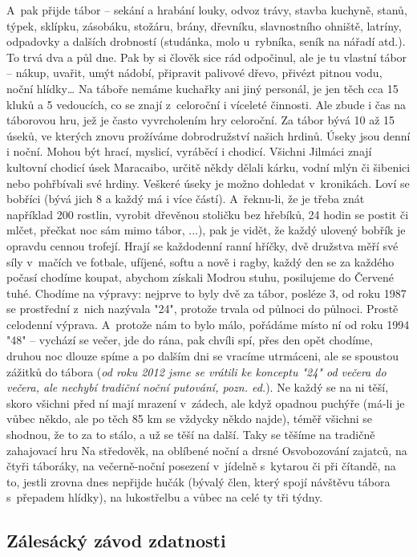 \documentclass[a5paper, 11pt, twoside]{article}
\begin{document}
A~pak přijde tábor -- sekání a hrabání louky, odvoz trávy, stavba
kuchyně, stanů, týpek, sklípku, zásobáku, stožáru, brány, dřevníku,
slavnostního ohniště, latríny, odpadovky a dalších drobností (studánka,
molo u~rybníka, seník na nářadí atd.). To trvá dva a půl dne. Pak by si
člověk sice rád odpočinul, ale je tu vlastní tábor -- nákup, uvařit,
umýt nádobí, připravit palivové dřevo, přivézt pitnou vodu, noční
hlídky\ldots{} Na táboře nemáme kuchařky ani jiný personál, je jen těch
cca 15 kluků a 5 vedoucích, co se znají z~celoroční i víceleté činnosti.
Ale zbude i čas na táborovou hru, jež je často vyvrcholením hry
celoroční. Za tábor bývá 10 až 15 úseků, ve kterých znovu prožíváme
dobrodružství našich hrdinů. Úseky jsou denní i noční. Mohou být hrací,
myslicí, vyráběcí i chodicí. Všichni Jilmáci znají kultovní chodicí úsek
Maracaibo, určitě někdy dělali kárku, vodní mlýn či šibenici nebo
pohřbívali své hrdiny. Veškeré úseky je možno dohledat v~kronikách. Loví
se bobříci (bývá jich 8 a každý má i více částí). A~řeknu-li, že je
třeba znát například 200 rostlin, vyrobit dřevěnou stoličku bez hřebíků,
24 hodin se postit či mlčet, přečkat noc sám mimo tábor, ...), pak je
vidět, že každý ulovený bobřík je opravdu cennou trofejí. Hrají se
každodenní ranní hříčky, dvě družstva měří své síly v~mačích ve fotbale,
ufíjené, softu a nově i ragby, každý den se za každého počasí chodíme
koupat, abychom získali Modrou stuhu, posilujeme do Červené tuhé.
Chodíme na výpravy: nejprve to byly dvě za tábor, posléze 3, od roku
1987 se prostřední z~nich nazývala "24", protože trvala od půlnoci do
půlnoci. Prostě celodenní výprava. A~protože nám to bylo málo, pořádáme
místo ní od roku 1994 "48" -- vychází se večer, jde do rána, pak chvíli
spí, přes den opět chodíme, druhou noc dlouze spíme a po dalším dni se
vracíme utrmáceni, ale se spoustou zážitků do tábora (\textit{od roku 2012
jsme se vrátili ke konceptu "24" od večera do večera, ale nechybí
tradiční noční putování, pozn. ed.}). Ne každý se na ni těší, skoro
všichni před ní mají mrazení v~zádech, ale když opadnou puchýře (má-li
je vůbec někdo, ale po těch 85 km se vždycky někdo najde), téměř všichni
se shodnou, že to za to stálo, a už se těší na další. Taky se těšíme na
tradičně zahajovací hru Na středověk, na oblíbené noční a drsné
Osvobozování zajatců, na čtyři táboráky, na večerně-noční posezení
v~jídelně s~kytarou či při čítandě, na to, jestli zrovna dnes nepřijde
hučák (bývalý člen, který spojí návštěvu tábora s~přepadem hlídky), na
lukostřelbu a vůbec na celé ty tři týdny.

\subsection{Zálesácký závod
zdatnosti}
\end{document}
